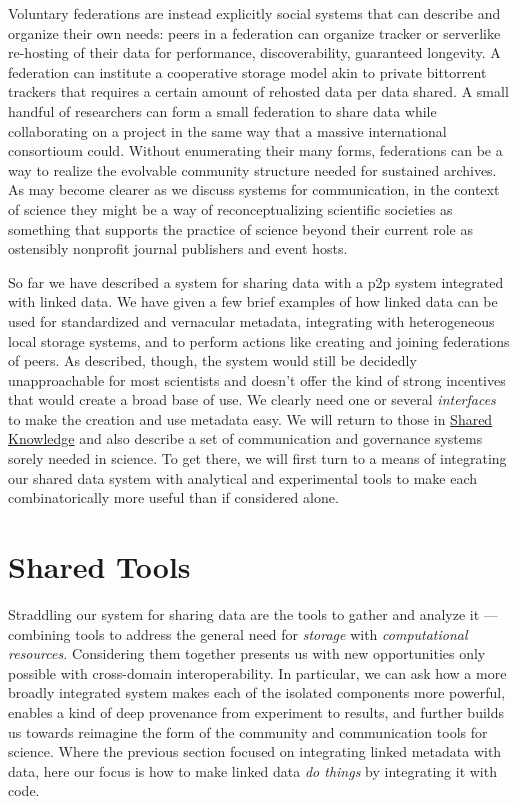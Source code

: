 Voluntary federations are instead explicitly social systems that can
describe and organize their own needs: peers in a federation can
organize tracker or serverlike re-hosting of their data for performance,
discoverability, guaranteed longevity. A federation can institute a
cooperative storage model akin to private bittorrent trackers that
requires a certain amount of rehosted data per data shared. A small
handful of researchers can form a small federation to share data while
collaborating on a project in the same way that a massive international
consortioum could. Without enumerating their many forms, federations can
be a way to realize the evolvable community structure needed for
sustained archives. As may become clearer as we discuss systems for
communication, in the context of science they might be a way of
reconceptualizing scientific societies as something that supports the
practice of science beyond their current role as ostensibly nonprofit
journal publishers and event hosts.

So far we have described a system for sharing data with a p2p system
integrated with linked data. We have given a few brief examples of how
linked data can be used for standardized and vernacular metadata,
integrating with heterogeneous local storage systems, and to perform
actions like creating and joining federations of peers. As described,
though, the system would still be decidedly unapproachable for most
scientists and doesn't offer the kind of strong incentives that would
create a broad base of use. We clearly need one or several
\emph{interfaces} to make the creation and use metadata easy. We will
return to those in \protect\hyperlink{shared-knowledge}{Shared
Knowledge} and also describe a set of communication and governance
systems sorely needed in science. To get there, we will first turn to a
means of integrating our shared data system with analytical and
experimental tools to make each combinatorically more useful than if
considered alone.

\hypertarget{shared-tools}{%
\section{Shared Tools}\label{shared-tools}}

Straddling our system for sharing data are the tools to gather and
analyze it --- combining tools to address the general need for
\emph{storage} with \emph{computational resources.} Considering them
together presents us with new opportunities only possible with
cross-domain interoperability. In particular, we can ask how a more
broadly integrated system makes each of the isolated components more
powerful, enables a kind of deep provenance from experiment to results,
and further builds us towards reimagine the form of the community and
communication tools for science. Where the previous section focused on
integrating linked metadata with data, here our focus is how to make
linked data \emph{do things} by integrating it with code.

